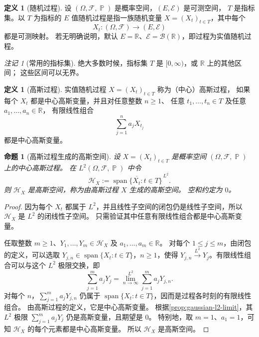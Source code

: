 \documentclass[UTF8,11pt,a4paper,oneside,fontset=fandol]{ctexrep}
\numberwithin{equation}{section}
\theoremstyle{plain}
\newtheorem{proposition}[theorem]{命题}
\theoremstyle{definition}
\newtheorem{definition}[theorem]{定义}
\theoremstyle{remark}
\newtheorem{remark}[theorem]{注记}
\newcommand{\R}{\mathbb{R}}
\newcommand{\B}{\mathcal{B}}
\newcommand{\F}{\mathcal{F}}
\newcommand{\Hcal}{\mathcal{H}}
\DeclareMathOperator{\Prob}{\mathbb{P}}
\newcommand{\Lpto}[1]{\xrightarrow{L^{#1}}}
\begin{document}
\begin{definition}[随机过程]
\label{def:stochastic-process}
设 $(\Omega,\F,\Prob)$ 是概率空间，$(E,\mathcal{E})$ 是可测空间，
$T$ 是指标集。以 $T$ 为指标的 $E$ 值随机过程是指一族随机变量
$X=(X_t)_{t\in T}$，其中每个
\[
  X_t:(\Omega,\F)\longrightarrow(E,\mathcal{E})
\]
都是可测映射。
若无明确说明，默认 $E=\R$、$\mathcal{E}=\B(\R)$，即过程为实值随机过程。
\end{definition}

\begin{remark}[常用的指标集]
\label{rem:process-index-set}
绝大多数时候，指标集 $T$ 是 $[0,\infty)$，或 $\R$ 上的其他区间；
这些区间可以无界。
\end{remark}

\begin{definition}[高斯过程]
\label{def:gaussian-process}
实值随机过程 $X=(X_t)_{t\in T}$ 称为（中心）高斯过程，
如果每个 $X_t$ 都是中心高斯变量，并且对任意整数 $n\ge1$、
任意 $t_1,\ldots,t_n\in T$ 及任意 $a_1,\ldots,a_n\in\R$，
有限线性组合
\[
  \sum_{j=1}^{n}a_jX_{t_j}
\]
都是中心高斯变量。
\end{definition}

\begin{proposition}[高斯过程生成的高斯空间]
\label{prop:gaussian-process-generated-space}
设 $X=(X_t)_{t\in T}$ 是概率空间 $(\Omega,\F,\Prob)$ 上的中心高斯过程。
在 $L^2(\Omega,\F,\Prob)$ 中令
\[
  \Hcal_X
  :=\overline{\operatorname{span}\{X_t:t\in T\}}^{\,L^2}.
\]
则 $\Hcal_X$ 是高斯空间，称为由高斯过程 $X$ 生成的高斯空间。
空和约定为 $0$。
\end{proposition}

\begin{proof}
因为每个 $X_t$ 都属于 $L^2$，并且线性子空间的闭包仍是线性子空间，所以 $\Hcal_X$ 是 $L^2$ 的闭线性子空间。
只需验证其中任意有限线性组合都是中心高斯变量。

任取整数 $m\ge1$、$Y_1,\ldots,Y_m\in\Hcal_X$ 及
$a_1,\ldots,a_m\in\R$。
对每个 $1\le j\le m$，由闭包的定义，可以选取
$Y_{j,n}\in\operatorname{span}\{X_t:t\in T\}$，$n\ge1$，使得
$Y_{j,n}\Lpto{2}Y_j$。有限线性组合可以与这个 $L^2$ 极限交换，即
\[
  \sum_{j=1}^{m}a_jY_j
  =\lim_{n\to\infty}^{L^2}\sum_{j=1}^{m}a_jY_{j,n}.
\]
对每个 $n$，$\sum_{j=1}^{m}a_jY_{j,n}$ 仍属于
$\operatorname{span}\{X_t:t\in T\}$，因而是过程各时刻的有限线性组合。
由高斯过程的定义，它是中心高斯变量。
根据\cref{prop:gaussian-l2-limit}，其 $L^2$ 极限
$\sum_{j=1}^{m}a_jY_j$ 仍是高斯变量，且期望是 $0$。
特别地，取 $m=1$、$a_1=1$，可知 $\Hcal_X$ 的每个元素都是中心高斯变量。
所以 $\Hcal_X$ 是高斯空间。
\end{proof}
\end{document}
